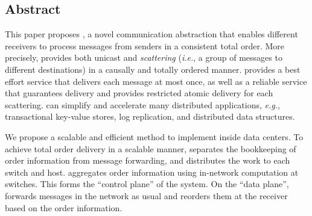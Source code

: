 \subsection*{Abstract}




This paper proposes \sys{}, a novel communication abstraction that enables different receivers to process messages from senders in a consistent total order.
More precisely, \sys{} provides both unicast and \emph{scattering} (\textit{i.e.}, a group of messages to different destinations) in a causally and totally ordered manner.
\sys{} provides a best effort service that delivers each message at most once, as well as a reliable service that guarantees delivery and provides restricted atomic delivery for each scattering.
\sys{} can simplify and accelerate many distributed applications, \emph{e.g.}, transactional key-value stores, log replication, and distributed data structures.

We propose a scalable and efficient method to implement \sys{} inside data centers. To achieve total order delivery in a scalable manner, \sys separates the bookkeeping of order information from message forwarding, and distributes the work to each switch and host. \sys aggregates order information using in-network computation at switches. This forms the ``control plane'' of the system. On the ``data plane'', \sys forwards messages in the network as usual and reorders them at the receiver based on the order information.

